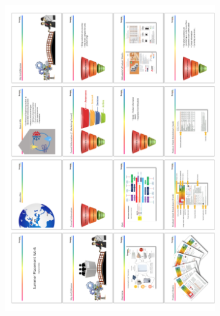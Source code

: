 \begin{figure}[htbp]
	\centering
	\begin{subfigure}{.78\textwidth}
		\centering
		\includegraphics[height=.8\textheight]{Appendices/Sunamp_Presentation_16spp_01.png}
	\end{subfigure}
	\begin{subfigure}{.18\textwidth}
		\centering

\end{subfigure}
\end{figure}
